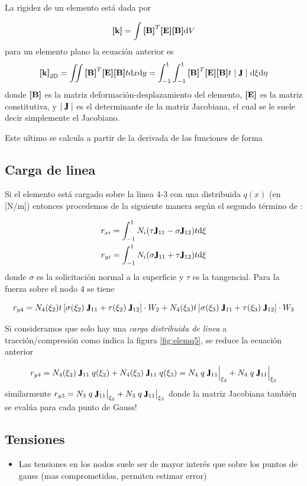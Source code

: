 La rigidez de un elemento está dada por 


\begin{equation} \label{eq:RigidezElemento}
\boldsymbol{[}\mathbf{k} \boldsymbol{]}=\int \boldsymbol{[}\mathbf{B} \boldsymbol{]}^T \boldsymbol{[}\mathbf{E} \boldsymbol{]} \boldsymbol{[}\mathbf{B} \boldsymbol{]} \textrm{d} V
\end{equation}
para un elemento plano la ecuación anterior es
\[
\Mk_{\mathrm{2D}}=\iint \MB^T \ME \MB t \di x \di y=\int^1_{-1}\int^1_{-1} \MB^T \ME \MB t \ \Djac \  \di\xi  \di\eta
\]
donde $\boldsymbol{[}\mathbf{B} \boldsymbol{]}$ es la matriz deformación-desplazamiento del elemento, $\boldsymbol{[}\mathbf{E} \boldsymbol{]}$ es la matriz constitutiva, y $\Djac$ es el determinante de la matriz Jacobiana, el cual se le suele decir simplemente el Jacobiano.

Este ultimo se calcula a partir de la derivada de las funciones de forma $ $

\subsection*{Carga de linea}
Si el elemento está cargado sobre la linea 4-3 con una distribuida $q(x)$ (en [N/m]) entonces procedemos de la siguiente manera según el segundo término de : 

\begin{align}
r_{xi}&=\int^1_{-1}N_i (\tau \jac_{11}- \sigma \jac_{12})t\di \xi \\
r_{yi}&=\int^1_{-1}N_i (\sigma \jac_{11}+\tau \jac_{12})t \di \xi 
\end{align}
donde $\sigma$ es la solicitación normal a la superficie y $\tau$ es la tangencial. Para la fuerza sobre el nodo 4 se tiene

$$r_{y4}= N_4(\xi_2)t\left[\sigma(\xi_2)\; \jac_{11}+\tau(\xi_2)\; \jac_{12}\right] \cdot W_2 + N_4(\xi_3)t\left[\sigma(\xi_3)\; \jac_{11}+\tau(\xi_3)\; \jac_{12}\right]\cdot W_3 $$

Si consideramos que solo hay una \emph{carga distribuida de linea} a tracción/compresión como indica la figura \ref{fig:elemq5}, se reduce la ecuación anterior

$$ r_{y4} = N_4(\xi_2)\;\jac_{11}\;q(\xi_2) + N_4(\xi_3)\;\jac_{11}\;q(\xi_3) =N_4\;q \;\jac_{11}\Big|_{\xi_2} + N_4\;q\; \jac_{11}\Big|_{\xi_3} $$
similarmente $r_{y3} = N_3\;q \;\jac_{11}\big|_{\xi_2} + N_3\;q\; \jac_{11}\big|_{\xi_3} $ donde la matriz Jacobiana también se evalúa para cada punto de Gauss!


\subsection*{Tensiones}
\begin{itemize}
	\item Las tensiones en los nodos suele ser de mayor interés que sobre los puntos de gauss (mas comprometidas, permiten estimar error)
\end{itemize}


